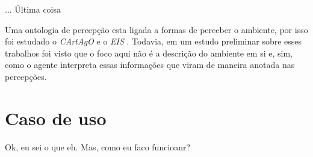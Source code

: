 ... Última coisa

Uma ontologia de percepção esta ligada a formas de perceber o ambiente, por
isso foi estudado o \emph{CArtAgO} e o \emph{EIS}
. Todavia, em um estudo preliminar sobre esses trabalhos foi
visto que o foco aqui não é a descrição do ambiente em si e, sim, como o
agente interpreta essas informações que viram de maneira anotada nas
percepções\dev{}.

\section{Caso de uso} \label{cap:tp:cdu}

Ok, eu sei o que eh.
Mas, como eu faco funcioanr?
